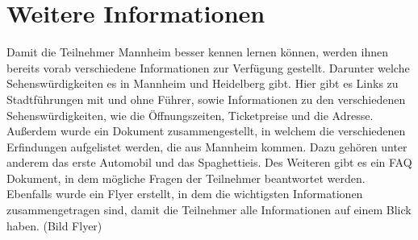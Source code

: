 \section{Weitere Informationen}
Damit die Teilnehmer Mannheim besser kennen lernen können, werden ihnen bereits vorab verschiedene Informationen zur Verfügung gestellt. Darunter welche Sehenswürdigkeiten es in Mannheim und Heidelberg gibt. Hier gibt es Links zu Stadtführungen mit und ohne Führer, sowie Informationen zu den verschiedenen Sehenswürdigkeiten, wie die Öffnungszeiten, Ticketpreise und die Adresse. Außerdem wurde ein Dokument zusammengestellt, in welchem die verschiedenen Erfindungen aufgelistet werden, die aus Mannheim kommen. Dazu gehören unter anderem das erste Automobil und das Spaghettieis. Des Weiteren gibt es ein FAQ Dokument, in dem mögliche Fragen der Teilnehmer beantwortet werden. Ebenfalls wurde ein Flyer erstellt, in dem die wichtigsten Informationen zusammengetragen sind, damit die Teilnehmer alle Informationen auf einem Blick haben. (Bild Flyer)
